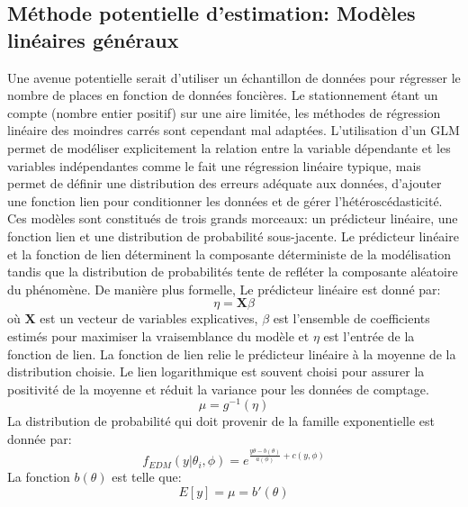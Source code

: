     \subsection{Méthode potentielle d'estimation: Modèles linéaires généraux}\label{sec:glm-regression models}
        Une avenue potentielle serait d'utiliser un échantillon de données pour régresser le nombre de places en fonction de données foncières. Le stationnement étant un compte (nombre entier positif) sur une aire limitée, les méthodes de régression linéaire des moindres carrés sont cependant mal adaptées. L'utilisation d'un \ac{GLM} \parencite{nelder_generalized_1972,cameron_regression_1998} permet de modéliser explicitement la relation entre la variable dépendante et les variables indépendantes comme le fait une régression linéaire typique, mais permet de définir une distribution des erreurs adéquate aux données, d'ajouter une fonction lien pour conditionner les données et de gérer l'hétéroscédasticité. Ces modèles sont constitués de trois grands morceaux: un prédicteur linéaire, une fonction lien et une distribution de probabilité sous-jacente. Le prédicteur linéaire et la fonction de lien déterminent la composante déterministe de la modélisation tandis que la distribution de probabilités tente de refléter la composante aléatoire du phénomène. De manière plus formelle, Le prédicteur linéaire est donné par:
        \begin{equation}
            \eta = \mathbf{X}\beta
        \end{equation}
        où $\mathbf{X}$ est un vecteur de variables explicatives, $\beta$ est l'ensemble de coefficients estimés pour maximiser la vraisemblance du modèle et $\eta$ est l'entrée de la fonction de lien. La fonction de lien relie le prédicteur linéaire à la moyenne de la distribution choisie. Le lien logarithmique est souvent choisi pour assurer la positivité de la moyenne et réduit la variance pour les données de comptage.
        \begin{equation}
            \mu = g^{-1}(\eta)
        \end{equation}
        La distribution de probabilité qui doit provenir de la famille exponentielle est donnée par:
        \begin{equation}
            f_{EDM}(y|\theta_i, \phi) =  e^{\frac{y\theta-b(\theta)}{a(\phi)}+c(y,\phi)}
        \end{equation}
        La fonction $b(\theta)$ est telle que:
        \begin{equation}
            E[y] =\mu= b'(\theta)
        \end{equation}
